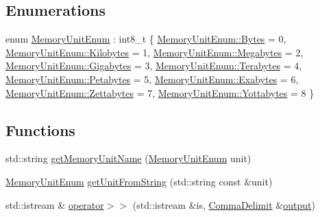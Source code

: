 \subsection*{Enumerations}
\begin{DoxyCompactItemize}
\item 
enum \hyperlink{namespacevt_1_1util_1_1memory_a64df3d84293b34009f78e2a1db2f9bb6}{Memory\+Unit\+Enum} \+: int8\+\_\+t \{ \newline
\hyperlink{namespacevt_1_1util_1_1memory_a64df3d84293b34009f78e2a1db2f9bb6a600e754f49b68aa0fc90a9cd64eb7051}{Memory\+Unit\+Enum\+::\+Bytes} = 0, 
\hyperlink{namespacevt_1_1util_1_1memory_a64df3d84293b34009f78e2a1db2f9bb6aa3a6c675a174320497f3bed7e8dc3329}{Memory\+Unit\+Enum\+::\+Kilobytes} = 1, 
\hyperlink{namespacevt_1_1util_1_1memory_a64df3d84293b34009f78e2a1db2f9bb6a2276a1b157f2813f3b65d04c0b1c56f6}{Memory\+Unit\+Enum\+::\+Megabytes} = 2, 
\hyperlink{namespacevt_1_1util_1_1memory_a64df3d84293b34009f78e2a1db2f9bb6af6f7ad0fd5914138fb449b9011c8de7a}{Memory\+Unit\+Enum\+::\+Gigabytes} = 3, 
\newline
\hyperlink{namespacevt_1_1util_1_1memory_a64df3d84293b34009f78e2a1db2f9bb6a9a2365433d590975874f09f0d5b5216d}{Memory\+Unit\+Enum\+::\+Terabytes} = 4, 
\hyperlink{namespacevt_1_1util_1_1memory_a64df3d84293b34009f78e2a1db2f9bb6a05a340fbd2fb19c6bf2a92a854b8db6f}{Memory\+Unit\+Enum\+::\+Petabytes} = 5, 
\hyperlink{namespacevt_1_1util_1_1memory_a64df3d84293b34009f78e2a1db2f9bb6a1e7535056f489fc82f76fae19149b2ef}{Memory\+Unit\+Enum\+::\+Exabytes} = 6, 
\hyperlink{namespacevt_1_1util_1_1memory_a64df3d84293b34009f78e2a1db2f9bb6ae7d195686624d72a3737ed4d84058f41}{Memory\+Unit\+Enum\+::\+Zettabytes} = 7, 
\newline
\hyperlink{namespacevt_1_1util_1_1memory_a64df3d84293b34009f78e2a1db2f9bb6a2be006d4ea302bcbb425e28e3b0c2e7b}{Memory\+Unit\+Enum\+::\+Yottabytes} = 8
 \}
\end{DoxyCompactItemize}
\subsection*{Functions}
\begin{DoxyCompactItemize}
\item 
std\+::string \hyperlink{namespacevt_1_1util_1_1memory_a6a1de4e8806e74e6e0ef92e4262b654b}{get\+Memory\+Unit\+Name} (\hyperlink{namespacevt_1_1util_1_1memory_a64df3d84293b34009f78e2a1db2f9bb6}{Memory\+Unit\+Enum} unit)
\item 
\hyperlink{namespacevt_1_1util_1_1memory_a64df3d84293b34009f78e2a1db2f9bb6}{Memory\+Unit\+Enum} \hyperlink{namespacevt_1_1util_1_1memory_aeceb7d7ac924dd3d88a58eab5ebf64f7}{get\+Unit\+From\+String} (std\+::string const \&unit)
\item 
std\+::istream \& \hyperlink{namespacevt_1_1util_1_1memory_afe1acbbca9aa1bd7310548cefd40045c}{operator$>$$>$} (std\+::istream \&is, \hyperlink{structvt_1_1util_1_1memory_1_1_comma_delimit}{Comma\+Delimit} \&\hyperlink{namespacevt_ad3ca3e8710dd3c8badff897f8de3c858}{output})
\end{DoxyCompactItemize}

